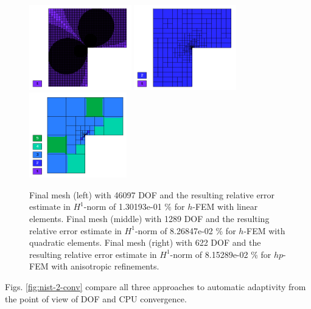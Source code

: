 \documentclass[12pt]{elsarticle}
\begin{document}
\begin{figure}[!ht]
\centering
\includegraphics[height=3.7cm]{nist/nist-2/mesh_h1_aniso.png}
\includegraphics[height=3.7cm]{nist/nist-2/mesh_h2_aniso.png}
\includegraphics[height=3.7cm]{nist/nist-2/mesh_hp_aniso.png}
\caption{
Final mesh (left) with 46097 DOF and the resulting
relative error estimate in $H^1$-norm of 1.30193e-01 \% for $h$-FEM with linear elements.
Final mesh (middle) with 1289 DOF and the resulting
relative error estimate in $H^1$-norm of 8.26847e-02 \% for $h$-FEM with quadratic elements.
Final mesh (right) with 622 DOF and the resulting
relative error estimate in $H^1$-norm of 8.15289e-02 \% for $hp$-FEM with anisotropic refinements.}
\label{fig:nist-2-hp-aniso}
\end{figure}


Figs. \ref{fig:nist-2-conv} compare all
three approaches to automatic adaptivity from the point
of view of DOF and CPU convergence.
\end{document}
